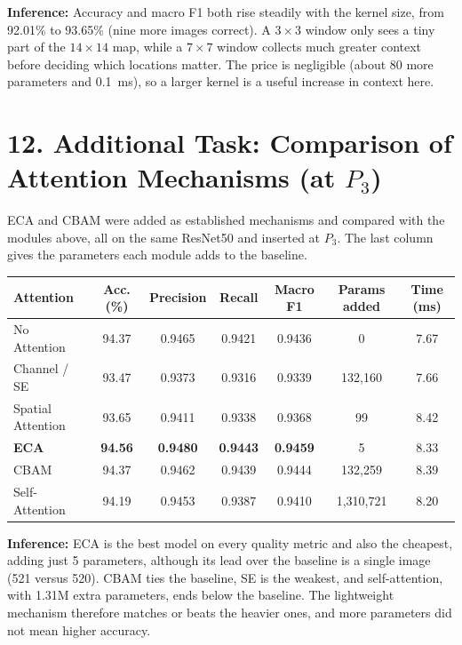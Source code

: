 \documentclass[10pt]{article}
\begin{document}
\textbf{Inference:} Accuracy and macro F1 both rise steadily with the
kernel size, from 92.01\% to 93.65\% (nine more images correct). A
$3\times3$ window only sees a tiny part of the $14\times14$ map, while a
$7\times7$ window collects much greater context before deciding which
locations matter. The price is negligible (about 80 more parameters and
0.1~ms), so a larger kernel is a useful increase in context here.

\section*{12. Additional Task: Comparison of Attention Mechanisms (at $P_3$)}

ECA and CBAM were added as established mechanisms and compared with the
modules above, all on the same ResNet50 and inserted at $P_3$. The last
column gives the parameters each module adds to the baseline.

\begin{center}
\small
\begin{tabular}{|l|c|c|c|c|c|c|}
\hline
Attention & Acc. (\%) & Precision & Recall & Macro F1 & Params added & Time (ms)\\
\hline
No Attention & 94.37 & 0.9465 & 0.9421 & 0.9436 & 0 & 7.67\\
Channel / SE & 93.47 & 0.9373 & 0.9316 & 0.9339 & 132{,}160 & 7.66\\
Spatial Attention & 93.65 & 0.9411 & 0.9338 & 0.9368 & 99 & 8.42\\
\textbf{ECA} & \textbf{94.56} & \textbf{0.9480} & \textbf{0.9443} & \textbf{0.9459} & 5 & 8.33\\
CBAM & 94.37 & 0.9462 & 0.9439 & 0.9444 & 132{,}259 & 8.39\\
Self-Attention & 94.19 & 0.9453 & 0.9387 & 0.9410 & 1{,}310{,}721 & 8.20\\
\hline
\end{tabular}
\end{center}

\textbf{Inference:} ECA is the best model on every quality metric and also
the cheapest, adding just 5 parameters, although its lead over the
baseline is a single image (521 versus 520). CBAM ties the baseline,
SE is the weakest, and self-attention, with 1.31M extra parameters, ends
below the baseline. The lightweight mechanism therefore matches or beats
the heavier ones, and more parameters did not mean higher accuracy.
\end{document}
